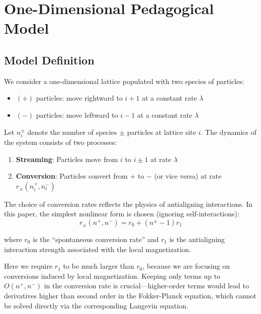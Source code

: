 
\section{One-Dimensional Pedagogical Model}\label{sec:1d-model}

\subsection{Model Definition}\label{subsec:model-def}

We consider a one-dimensional lattice populated with two species of particles:
\begin{itemize}
    \item $(+)$ particles: move rightward to $i+1$ at a constant rate $\lambda$
    \item $(-)$ particles: move leftward to $i-1$ at a constant rate $\lambda$
\end{itemize}

Let $n_i^\pm$ denote the number of species $\pm$ particles at lattice site $i$. The dynamics of the system consists of two processes:

\begin{keybox}
\begin{enumerate}
    \item \textbf{Streaming}: Particles move from $i$ to $i\pm 1$ at rate $\lambda$
    \item \textbf{Conversion}: Particles convert from $+$ to $-$ (or vice versa) at rate $r_\pm(n_i^+, n_i^-)$
\end{enumerate}
\end{keybox}

The choice of conversion rates reflects the physics of antialigning interactions. In this paper, the simplest nonlinear form is chosen (ignoring self-interactions):
\begin{equation}\label{eq:conversion-rate}
\boxed{r_\pm(n^+, n^-) = r_0 + (n^\pm - 1)r_1}
\end{equation}

where $r_0$ is the ``spontaneous conversion rate'' and $r_1$ is the antialigning interaction strength associated with the local magnetization.

\begin{remark}
Here we require $r_1$ to be much larger than $r_0$, because we are focusing on conversions induced by local magnetization. Keeping only terms up to $O(n^+, n^-)$ in the conversion rate is crucial---higher-order terms would lead to derivatives higher than second order in the Fokker-Planck equation, which cannot be solved directly via the corresponding Langevin equation.
\end{remark}

